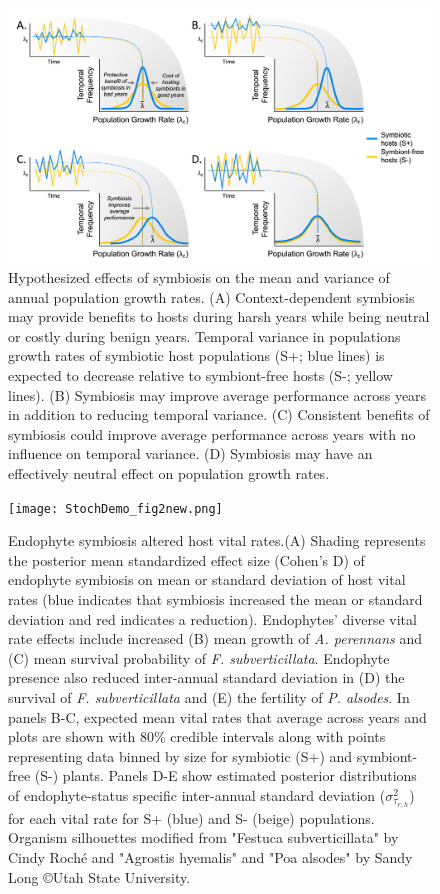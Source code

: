 \documentclass[lineno, sn-basic]{sn-jnl}%
\begin{document}
\begin{figure}[h]
	\centering
	\includegraphics[width=\linewidth]{StochDemo_new_Fig1.png}
	\caption[Hypothesized effects of symbiosis on the mean and variance of annual population growth rates]{Hypothesized effects of symbiosis on the mean and variance of annual population growth rates. (A) Context-dependent symbiosis may provide benefits to hosts during harsh years while being neutral or costly during benign years.  Temporal variance in populations growth rates of symbiotic host populations (S+; blue lines) is expected to decrease relative to symbiont-free hosts (S-; yellow lines). (B) Symbiosis may improve average performance across years in addition to reducing temporal variance. (C) Consistent benefits of symbiosis could improve average performance across years with no influence on temporal variance. (D) Symbiosis may have an effectively neutral effect on population growth rates.}
\end{figure}

\begin{figure}[h]
	\centering
	\texttt{[image: StochDemo\_fig2new.png]}
	\caption[Endophyte symbiosis altered host vital rates]{Endophyte symbiosis altered host vital rates.(A) Shading represents the posterior mean standardized effect size (Cohen's D) of endophyte symbiosis on mean or standard deviation of host vital rates (blue indicates that symbiosis increased the mean or standard deviation and red indicates a reduction). Endophytes' diverse vital rate effects include increased (B) mean growth of \emph{A. perennans} and (C) mean survival probability of \emph{F. subverticillata}. Endophyte presence also reduced inter-annual standard deviation in (D) the survival of \emph{F. subverticillata} and (E) the fertility of \emph{P. alsodes}. In panels B-C, expected mean vital rates that average across years and plots are shown with 80\% credible intervals along with points representing data binned by size for symbiotic (S+) and symbiont-free (S-) plants. Panels D-E show estimated posterior distributions of endophyte-status specific inter-annual standard deviation ($\sigma^2_{\tau_{e,h}}$)  for each vital rate for S+ (blue) and S- (beige) populations. Organism silhouettes modified from "Festuca subverticillata" by Cindy Roch\'e and "Agrostis hyemalis" and "Poa alsodes" by Sandy Long \copyright Utah State University.}
\end{figure}
\end{document}

